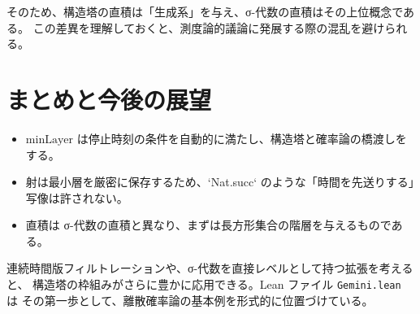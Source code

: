 \documentclass[a4paper,11pt]{ltjsarticle}
\begin{document}
そのため、構造塔の直積は「生成系」を与え、σ-代数の直積はその上位概念である。
この差異を理解しておくと、測度論的議論に発展する際の混乱を避けられる。

\section{まとめと今後の展望}

\begin{itemize}
  \item \(\mathrm{minLayer}\) は停止時刻の条件を自動的に満たし、構造塔と確率論の橋渡しをする。
  \item 射は最小層を厳密に保存するため、`Nat.succ` のような「時間を先送りする」写像は許されない。
  \item 直積は σ-代数の直積と異なり、まずは長方形集合の階層を与えるものである。
\end{itemize}

連続時間版フィルトレーションや、σ-代数を直接レベルとして持つ拡張を考えると、
構造塔の枠組みがさらに豊かに応用できる。Lean ファイル \texttt{Gemini.lean} は
その第一歩として、離散確率論の基本例を形式的に位置づけている。
\end{document}
